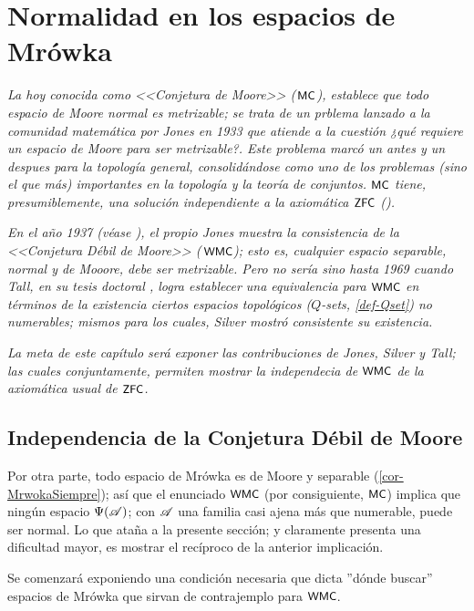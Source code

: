 \chapter{Normalidad en los espacios de Mrówka}

    \index[sym]{$\Pm$}\index[sym]{$\Pdm$}
    \emph{\small La hoy conocida como <<Conjetura de Moore>> (\,$\Pm$), establece que todo espacio de Moore normal es metrizable; se trata de un prblema lanzado a la comunidad matemática por Jones en 1933 que atiende a la cuestión ¿qué requiere un espacio de Moore para ser metrizable?. Este problema marcó un antes y un despues para la topología general, consolidándose como uno de los problemas (sino el que más) importantes en la topología y la teoría de conjuntos. $\Pm$ tiene, presumiblemente, una solución independiente a la axiomática $\text{\textsf{\small ZFC}}$ (\cite[p.~429-435]{nyikosMoore}).}
   
    \emph{\small En el año 1937 (véase \cite[Teo~5, p.~ 676]{jonesCM}), el propio Jones muestra la consistencia de la <<Conjetura Débil de Moore>> (\,$\Pdm$); esto es, cualquier espacio separable, normal y de Mooore, debe ser metrizable. Pero no sería sino hasta 1969 cuando Tall, en su tesis doctoral \cite{tallTesis}, logra establecer una equivalencia para $\Pdm$ en términos de la existencia ciertos espacios topológicos ($Q$-sets, \autoref{def-Qset}) no numerables; mismos para los cuales, Silver mostró consistente su existencia.}

    \emph{\small La meta de este capítulo será exponer las contribuciones de Jones, Silver y Tall; las cuales conjuntamente, permiten mostrar la independecia de $\Pdm$ de la axiomática usual de $\text{\textsf{\small ZFC}}$.}

    \section{Independencia de la Conjetura Débil de Moore}

    Por otra parte, todo espacio de Mrówka es de Moore y separable (\autoref{cor-MrwokaSiempre}); así que el enunciado $\Pdm$ (por consiguiente, $\Pm$) implica que ningún espacio $\Psi(\mathscr{A})$; con $\mathscr{A}$ una familia casi ajena más que numerable, puede ser normal. Lo que ataña a la presente sección; y claramente presenta una dificultad mayor, es mostrar el recíproco de la anterior implicación.

    Se comenzará exponiendo una condición necesaria que dicta ''dónde buscar'' espacios de Mrówka que sirvan de contrajemplo para $\Pdm$.
    
